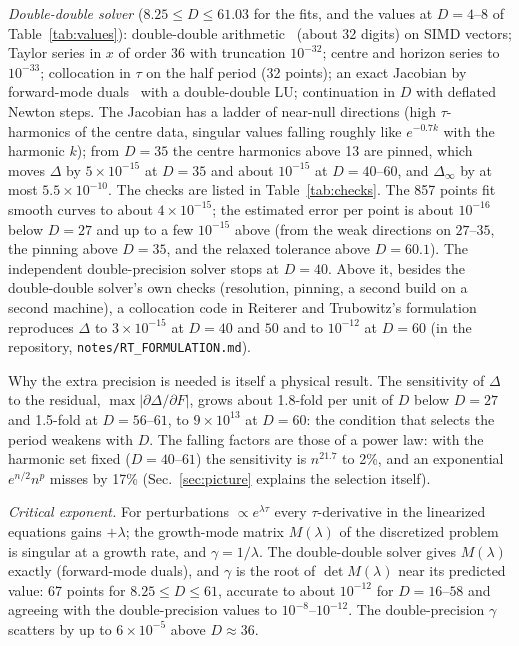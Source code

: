 \documentclass[aps,prd,onecolumn,superscriptaddress,nofootinbib,10pt]{revtex4-2}
\newcommand{\Dinf}{\Delta_\infty}
\begin{document}
\emph{Double-double solver} ($8.25 \le D \le 61.03$ for the fits, and the values at $D = 4$--$8$ of Table~\ref{tab:values}): double-double arithmetic~\cite{Dekker1971} (about 32 digits) on SIMD vectors;
Taylor series in $x$ of order 36 with truncation $10^{-32}$; centre and horizon series to $10^{-33}$; collocation in
$\tau$ on the half period (32 points); an exact Jacobian by forward-mode duals~\cite{Wengert1964} with a double-double LU; continuation in
$D$ with deflated Newton steps. The Jacobian has a ladder of near-null directions (high $\tau$-harmonics of the centre
data, singular values falling roughly like $e^{-0.7k}$ with the harmonic $k$); from $D = 35$ the centre harmonics above
13 are pinned, which moves $\Delta$ by $5\times10^{-15}$ at $D = 35$ and about $10^{-15}$ at $D = 40$--$60$, and $\Dinf$ by at most
$5.5\times10^{-10}$. The checks are
listed in Table~\ref{tab:checks}. The 857 points fit smooth curves to about $4\times10^{-15}$; the estimated error per
point is about $10^{-16}$ below $D = 27$ and up to a few $10^{-15}$ above (from the weak directions on $27$--$35$, the
pinning above $D = 35$, and the relaxed tolerance above $D = 60.1$). The independent double-precision solver stops at
$D = 40$. Above it, besides the double-double solver's own checks (resolution, pinning, a second build on a second
machine), a collocation code in Reiterer and Trubowitz's formulation reproduces $\Delta$ to $3\times10^{-15}$ at
$D = 40$ and $50$ and to $10^{-12}$ at $D = 60$ (in the repository, \texttt{notes/RT\_FORMULATION.md}).

Why the extra precision is needed is itself a physical result. The sensitivity of $\Delta$ to the residual,
$\max|\partial\Delta/\partial F|$, grows about 1.8-fold per unit of $D$ below $D = 27$ and 1.5-fold at $D = 56$--$61$, to
$9\times10^{13}$ at $D = 60$: the condition that selects the period weakens with $D$. The falling factors are those of a
power law: with the harmonic set fixed ($D = 40$--$61$) the sensitivity is $n^{21.7}$ to 2\%, and an exponential
$e^{n/2}n^p$ misses by 17\% (Sec.~\ref{sec:picture} explains the selection itself).

\emph{Critical exponent.} For perturbations $\propto e^{\lambda\tau}$ every $\tau$-derivative in the linearized equations
gains $+\lambda$; the growth-mode matrix $M(\lambda)$ of the discretized problem is singular at a growth rate, and
$\gamma = 1/\lambda$. The double-double solver gives $M(\lambda)$ exactly (forward-mode duals), and $\gamma$ is the root
of $\det M(\lambda)$ near its predicted value: 67 points for $8.25 \le D \le 61$, accurate to about $10^{-12}$ for
$D = 16$--$58$ and agreeing with the double-precision values to $10^{-8}$--$10^{-12}$. The double-precision $\gamma$
scatters by up to $6\times10^{-5}$ above $D \approx 36$.
\end{document}

